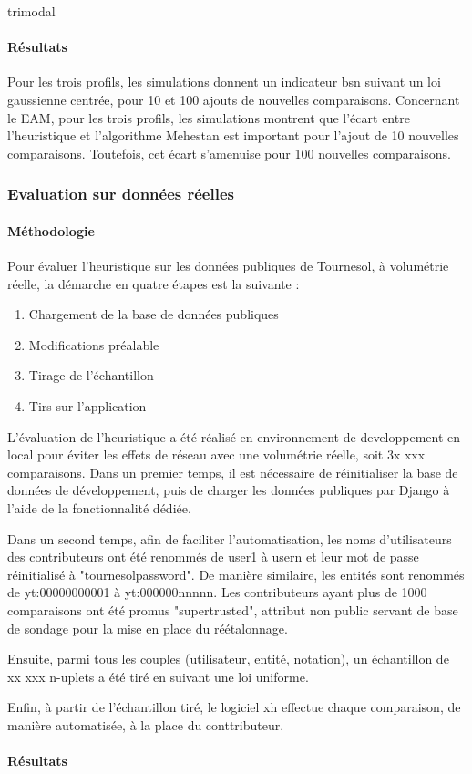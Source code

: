 trimodal

\paragraph{Résultats}

Pour les trois profils, les simulations donnent un indicateur \gls{bsn} suivant un loi gaussienne centrée, pour 10 et 100 ajouts de nouvelles comparaisons.
Concernant le \gls{EAM}, pour les trois profils, les simulations montrent que l'écart entre l'heuristique et l'algorithme Mehestan est important pour l'ajout de 10 nouvelles comparaisons. Toutefois, cet écart s'amenuise pour 100 nouvelles comparaisons.


\subsubsection{Evaluation sur données réelles}


\paragraph{Méthodologie}

Pour évaluer l'heuristique sur les données publiques de Tournesol, à volumétrie réelle, la démarche en quatre étapes est la suivante :

\begin{enumerate}
    \item Chargement de la base de données publiques
    \item Modifications préalable
    \item Tirage de l'échantillon
    \item Tirs sur l'application
\end{enumerate}
L'évaluation de l'heuristique a été réalisé en environnement de developpement en local pour éviter les effets de réseau avec une volumétrie réelle, soit 3x xxx comparaisons.
Dans un premier temps, il est nécessaire de réinitialiser la base de données de développement, puis de charger les données publiques par Django à l'aide de la fonctionnalité dédiée.

Dans un second temps, afin de faciliter l'automatisation, les noms d'utilisateurs des contributeurs ont été renommés de user1 à usern et leur mot de passe réinitialisé à "tournesolpassword". De manière similaire, les entités sont renommés de yt:00000000001 à yt:000000nnnnn. Les contributeurs ayant plus de 1000 comparaisons ont été promus "supertrusted", attribut non public servant de base de sondage pour la mise en place du réétalonnage.

Ensuite, parmi tous les couples (utilisateur, entité, notation), un échantillon de xx xxx n-uplets a été tiré en suivant une loi uniforme.

Enfin, à partir de l'échantillon tiré, le logiciel xh effectue chaque comparaison, de manière automatisée, à la place du conttributeur.


\paragraph{Résultats}

\pagebreak